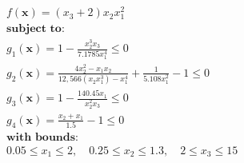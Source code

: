 \begin{equation*}
\begin{aligned}
& f(\bm{x}) = (x_3 + 2)x_2x_1^2 \\[0.5em]
& \textbf{subject to:}\\
& g_1(\bm{x}) = 1 - \frac{x_2^3 x_3}{7.1785 x_1^4} \leq 0 \\
& g_2(\bm{x}) = \frac{4x_2^2 - x_1 x_2}{12,566 (x_2 x_1^3) - x_1^4} + \frac{1}{5.108 x_1^2} - 1 \leq 0 \\
& g_3(\bm{x}) = 1 - \frac{140.45 x_1}{x_2^2 x_3} \leq 0 \\
& g_4(\bm{x}) = \frac{x_2 + x_1}{1.5} - 1 \leq 0 \\[0.5em]
& \textbf{with bounds:} \\
& 0.05 \leq x_1 \leq 2, \quad 0.25 \leq x_2 \leq 1.3, \quad 2 \leq x_3 \leq 15
\end{aligned}
\end{equation*}